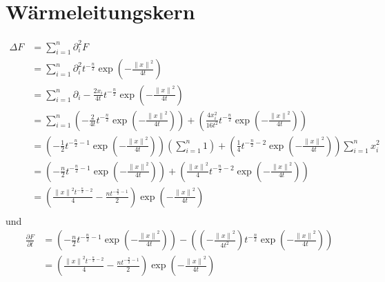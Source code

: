 \documentclass[sectionformat=aufgabe]{gadsescript}
\begin{document}
\section{Wärmeleitungskern}
\begin{align*}
	\Delta F &= \sum_{i=1}^{n} \partial_i^2 F \\
	~ &= \sum_{i=1}^{n} \partial_i^2 t^{- \frac{ n }{ 2 } } \exp \left( - \frac{ \left\| x \right\| ^2 }{ 4t }  \right)  \\
	~ &= \sum_{i=1}^{n} \partial_i - \frac{2 x_i}{ 4t }  t ^{- \frac{ n }{ 2 } } \exp \left( - \frac{ \left\| x \right\| ^2 }{ 4t }  \right)  \\
	~ &= \sum_{i=1}^{n}
	\left( - \frac{ 2 }{ 4t } t ^{- \frac{ n }{ 2 } } \exp \left( - \frac{ \left\| x \right\| ^2 }{ 4t }  \right)  \right)
	+
	\left( \frac{ 4x_i^2 }{ 16t^2 } t ^{- \frac{ n }{ 2 } } \exp \left( - \frac{ \left\| x \right\| ^2 }{ 4t }  \right)   \right)  \\
	~ &= \left( - \frac{ 1 }{ 2 } t ^{- \frac{ n }{ 2 } - 1 } \exp \left( - \frac{ \left\| x \right\| ^2 }{ 4t }  \right)  \right) \left( \sum_{i=1}^{n} 1 \right) 
	+
	\left( \frac{ 1 }{ 4 } t ^{- \frac{ n }{ 2 } - 2 } \exp \left( - \frac{ \left\| x \right\| ^2 }{ 4t }  \right)   \right) \sum_{i=1}^{n} x_i^2 \\
	~ &= \left( - \frac{ n }{ 2 } t ^{- \frac{ n }{ 2 } - 1 } \exp \left( - \frac{ \left\| x \right\| ^2 }{ 4t }  \right)  \right) 
	+
	\left( \frac{ \left\| x \right\| ^2 }{ 4 } t ^{- \frac{ n }{ 2 } - 2 } \exp \left( - \frac{ \left\| x \right\| ^2 }{ 4t }  \right)   \right) \\
	~ &= \left( \frac{ \left\| x \right\| ^2 t ^{-\frac{ n }{ 2 } - 2} }{ 4 } - \frac{ n t ^{-\frac{ n }{ 2 } -1} }{ 2 }  \right) \exp \left( - \frac{ \left\| x \right\| ^2 }{ 4t }  \right)  \\
\end{align*}
und
\begin{align*}
	\frac{ \partial F }{ \partial t } &= \left( - \frac{ n }{ 2 } t ^{-\frac{ n }{ 2 } -1} \exp \left( - \frac{ \left\| x \right\| ^2 }{ 4t }  \right) \right) - \left( \left(- \frac{ \left\| x \right\| ^2 }{ 4t^2 } \right) t^{-\frac{ n }{ 2 } } \exp \left( - \frac{\left\| x \right\| ^2 }{ 4t }  \right)  \right) \\
	~ &= \left( \frac{ \left\| x \right\| ^2 t ^{-\frac{ n }{ 2 } - 2} }{ 4 } - \frac{ n t ^{-\frac{ n }{ 2 } -1} }{ 2 }  \right) \exp \left( - \frac{ \left\| x \right\| ^2 }{ 4t }  \right)  \\
\end{align*}
\end{document}
